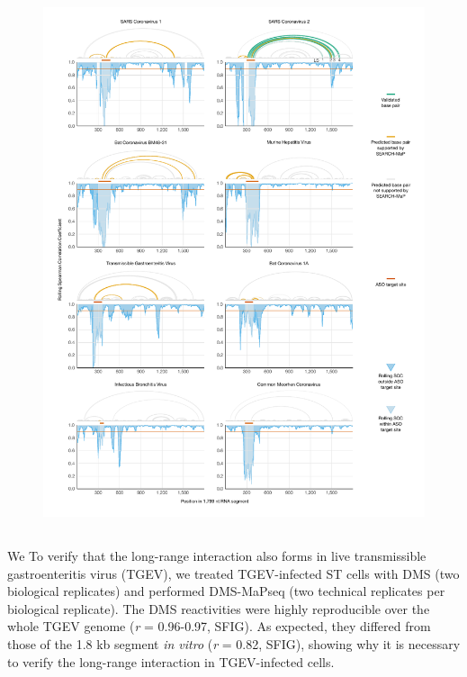 \documentclass[main.tex]{subfiles}
\begin{document}
\begin{figure}[ht]
	\includegraphics[height=0.95\textheight]{../MainFigures/covs/covs.pdf}
	\caption{}
	\label{covs}
\end{figure}


\subsection{}

We 
To verify that the long-range interaction also forms in live transmissible gastroenteritis virus (TGEV), we treated TGEV-infected ST cells with DMS (two biological replicates) and performed DMS-MaPseq (two technical replicates per biological replicate).
The DMS reactivities were highly reproducible over the whole TGEV genome (\textit{r} = 0.96-0.97, SFIG).
As expected, they differed from those of the 1.8 kb segment \textit{in vitro} (\textit{r} = 0.82, SFIG), showing why it is necessary to verify the long-range interaction in TGEV-infected cells.
\end{document}
